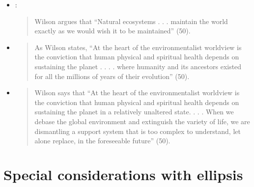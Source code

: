 \begin{itemize}

\item {}: \begin{quote}Wilson argues
that “Natural ecosystems . . . maintain the world exactly as we would wish it to
be maintained” (50).\end{quote}


\item {} \begin{quote}As Wilson states, “At the heart of the environmentalist
worldview is the conviction that human physical and spiritual health depends on
sustaining the planet . . . . where humanity and its ancestors existed for all
the millions of years of their evolution” (50).\end{quote}

\item {}\begin{quote} Wilson says that
“At the heart of the environmentalist worldview is the conviction that human
physical and spiritual health depends on sustaining the planet in a relatively
unaltered state. . . . When we debase the global environment and extinguish the
variety of life, we are dismantling a support system that is too complex to
understand, let alone replace, in the foreseeable future” (50).\end{quote}

\end{itemize}

\section*{Special considerations with ellipsis}

